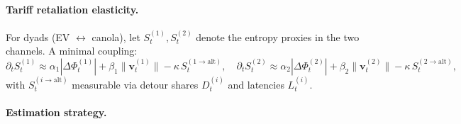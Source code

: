\documentclass{article}
\begin{document}
\paragraph{Tariff retaliation elasticity.}
For dyads (EV $\leftrightarrow$ canola), let $S^{(1)}_t, S^{(2)}_t$ denote the
entropy proxies in the two channels. A minimal coupling:
\[
\partial_t S^{(1)}_t \approx \alpha_1 |\Delta \Phi^{(1)}_t| + \beta_1 \|\mathbf{v}^{(1)}_t\|
- \kappa \, S^{(1\to \mathrm{alt})}_t, \quad
\partial_t S^{(2)}_t \approx \alpha_2 |\Delta \Phi^{(2)}_t| + \beta_2 \|\mathbf{v}^{(2)}_t\|
- \kappa \, S^{(2\to \mathrm{alt})}_t,
\]
with $S^{(i\to \mathrm{alt})}_t$ measurable via detour shares $D^{(i)}_t$ and
latencies $L^{(i)}_t$.

\paragraph{Estimation strategy.}
\end{document}
